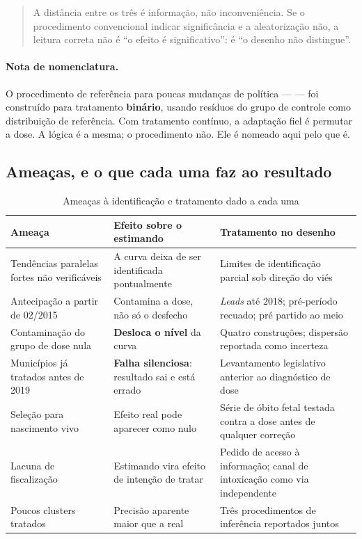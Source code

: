 \begin{quote}
A distância entre os três é informação, não inconveniência. Se o procedimento
convencional indicar significância e a aleatorização não, a leitura correta não é
``o efeito é significativo'': é ``o desenho não distingue''.
\end{quote}

\paragraph{Nota de nomenclatura.} O procedimento de referência para poucas
mudanças de política --- \citet{conley2011} --- foi construído para tratamento
\textbf{binário}, usando resíduos do grupo de controle como distribuição de
referência. Com tratamento contínuo, a adaptação fiel é permutar a dose. A lógica
é a mesma; o procedimento não. Ele é nomeado aqui pelo que é.

\subsection{Ameaças, e o que cada uma faz ao resultado}
\label{sub:ameacas}

\begin{table}[htbp]
\centering
\caption{Ameaças à identificação e tratamento dado a cada uma}
\label{tab:ameacas}
\small
\begin{tabular}{p{4.2cm}p{4.6cm}p{4.6cm}}
\hline
Ameaça & Efeito sobre o estimando & Tratamento no desenho \\
\hline
Tendências paralelas fortes não verificáveis
& A curva deixa de ser identificada pontualmente
& Limites de identificação parcial sob direção do viés \\

Antecipação a partir de 02/2015
& Contamina a dose, não só o desfecho
& \emph{Leads} até 2018; pré-período recuado; pré partido ao meio \\

Contaminação do grupo de dose nula
& \textbf{Desloca o nível} da curva
& Quatro construções; dispersão reportada como incerteza \\

Municípios já tratados antes de 2019
& \textbf{Falha silenciosa}: resultado sai e está errado
& Levantamento legislativo anterior ao diagnóstico de dose \\

Seleção para nascimento vivo
& Efeito real pode aparecer como nulo
& Série de óbito fetal testada contra a dose antes de qualquer correção \\

Lacuna de fiscalização
& Estimando vira efeito de intenção de tratar
& Pedido de acesso à informação; canal de intoxicação como via independente \\

Poucos clusters tratados
& Precisão aparente maior que a real
& Três procedimentos de inferência reportados juntos \\
\hline
\end{tabular}
\end{table}

